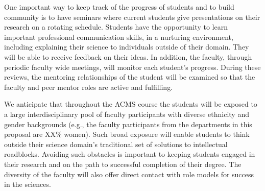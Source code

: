 One important way to keep track of the progress of students and to
build community is to have seminars where current students give
presentations on their research on a rotating schedule. Students have
the opportunity to learn important professional communication skills,
in a nurturing environment, including explaining their science to
individuals outside of their domain.  They will be able to receive
feedback on their ideas. In addition, the faculty, through periodic
faculty wide meetings, will monitor each student’s progress.  During
these reviews, the mentoring relationships of the student will be
examined so that the faculty and peer mentor roles are active and
fulfilling.

We anticipate that throughout the ACMS course the students will be
exposed to a large interdisciplinary pool of faculty participants with
diverse ethnicity and gender backgrounds (e.g., the faculty
participants from the departments in this proposal are XX\% women).
Such broad exposure will enable students to think outside their
science domain's traditional set of solutions to intellectual
roadblocks.  Avoiding such obstacles is important to keeping students
engaged in their research and on the path to successful completion of
their degree.  The diversity of the faculty will also offer direct
contact with role models for success in the sciences.
